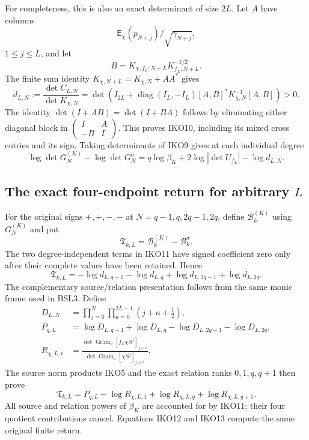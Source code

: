 For completeness, this is also an exact determinant of size $2L$.
Let $A$ have columns \[\mathsf E_\chi(p_{N+j})/\sqrt{\gamma_{N+j}},\]
$1\leq j\leq L$, and let
\[B=K_{\chi,f_L;N+L}K_{f_L,N+L}^{-1/2}.\] The finite sum identity
$K_{\chi,N+L}=K_{\chi,N}+AA^*$ gives
\[
 d_{L,N}:=\frac{\det C_{L,N}}{\det K_{\chi,N}}
 =\det\left(I_{2L}+\operatorname{diag}(I_L,-I_L)
       [A,B]^*K_{\chi,N}^{-1}[A,B]\right)>0.
 \tag{IKO10}
\]
The identity $\det(I+AB)=\det(I+BA)$ follows by eliminating either
diagonal block in $\left(\begin{smallmatrix}I&A\\-B&I\end{smallmatrix}\right)$.
This proves IKO10, including its mixed cross entries and its sign.
Taking determinants of IKO9 gives at each individual degree
\[
 \log\det G_N^{(K)}-\log\det G_N^\sigma
 =q\log\beta_K+2\log|\det U_{f_L}|-\log d_{L,N}.
 \tag{IKO11}
\]

\subsection{The exact four-endpoint return for arbitrary $L$}
For the original signs $+,+,-,-$ at $N=q-1,q,2q-1,2q$, define
$\mathcal B_k^{(K)}$ using $G_N^{(K)}$ and put
\[
 \mathfrak T_{k;L}=\mathcal B_k^{(K)}-\mathcal B_k^\sigma.
\]
The two degree-independent terms in IKO11 have signed coefficient
zero only after their complete values have been retained. Hence
\[
 \mathfrak T_{k;L}
   =-\log d_{L,q-1}-\log d_{L,q}
                  +\log d_{L,2q-1}+\log d_{L,2q}.
 \tag{IKO12}
\]
The complementary source/relation presentation follows from the
same monic frame used in BSL3. Define
\[
 \begin{split}
 D_{L,N}&=\prod_{j=0}^N\prod_{a=0}^{2L-1}(j+a+\tfrac12),\\
 P_{q,L}&=\log D_{L,q-1}+\log D_{L,q}
                    -\log D_{L,2q-1}-\log D_{L,2q},\\
 R_{\chi,L,r}&=\frac{\det\operatorname{Gram}_{\sigma}
                    [f_L\chi S^j]_{j<r}}
                  {\det\operatorname{Gram}_{\sigma}
                    [\chi S^j]_{j<r}}.
 \end{split}
\]
The source norm products IKO5 and the exact relation ranks $0,1,q,q+1$
then prove
\[
 \boxed{\mathfrak T_{k;L}
       =P_{q,L}-\log R_{\chi,L,1}
                    +\log R_{\chi,L,q}+\log R_{\chi,L,q+1}.}
 \tag{IKO13}
\]
All source and relation powers of $\beta_K$ are accounted for by
IKO11; their four quotient contributions cancel. Equations IKO12 and
IKO13 compute the same original finite return.


